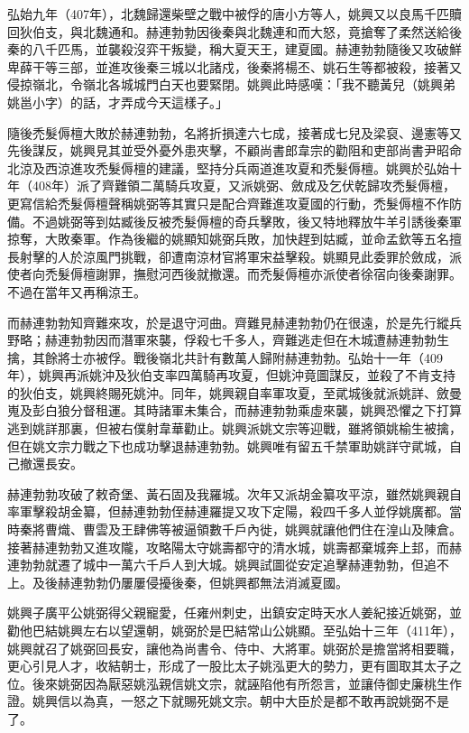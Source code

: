 弘始九年（407年），北魏歸還柴壁之戰中被俘的唐小方等人，姚興又以良馬千匹贖回狄伯支，與北魏通和。赫連勃勃因後秦與北魏連和而大怒，竟搶奪了柔然送給後秦的八千匹馬，並襲殺沒弈干叛變，稱大夏天王，建夏國。赫連勃勃隨後又攻破鮮卑薛干等三部，並進攻後秦三城以北諸戍，後秦將楊丕、姚石生等都被殺，接著又侵掠嶺北，令嶺北各城城門白天也要緊閉。姚興此時感嘆：「我不聽黃兒（姚興弟姚邕小字）的話，才弄成今天這樣子。」

隨後禿髮傉檀大敗於赫連勃勃，名將折損達六七成，接著成七兒及梁裒、邊憲等又先後謀反，姚興見其並受外憂外患夾擊，不顧尚書郎韋宗的勸阻和吏部尚書尹昭命北涼及西涼進攻禿髮傉檀的建議，堅持分兵兩道進攻夏和禿髮傉檀。姚興於弘始十年（408年）派了齊難領二萬騎兵攻夏，又派姚弼、斂成及乞伏乾歸攻禿髮傉檀，更寫信給禿髮傉檀聲稱姚弼等其實只是配合齊難進攻夏國的行動，禿髮傉檀不作防備。不過姚弼等到姑臧後反被禿髮傉檀的奇兵擊敗，後又特地釋放牛羊引誘後秦軍掠奪，大敗秦軍。作為後繼的姚顯知姚弼兵敗，加快趕到姑臧，並命孟欽等五名擅長射擊的人於涼風門挑戰，卻遭南涼材官將軍宋益擊殺。姚顯見此委罪於斂成，派使者向禿髮傉檀謝罪，撫慰河西後就撤還。而禿髮傉檀亦派使者徐宿向後秦謝罪。不過在當年又再稱涼王。

而赫連勃勃知齊難來攻，於是退守河曲。齊難見赫連勃勃仍在很遠，於是先行縱兵野略；赫連勃勃因而潛軍來襲，俘殺七千多人，齊難逃走但在木城遭赫連勃勃生擒，其餘將士亦被俘。戰後嶺北共計有數萬人歸附赫連勃勃。弘始十一年（409年），姚興再派姚沖及狄伯支率四萬騎再攻夏，但姚沖竟圖謀反，並殺了不肯支持的狄伯支，姚興終賜死姚沖。同年，姚興親自率軍攻夏，至貮城後就派姚詳、斂曼嵬及彭白狼分督租運。其時諸軍未集合，而赫連勃勃乘虛來襲，姚興恐懼之下打算逃到姚詳那裏，但被右僕射韋華勸止。姚興派姚文宗等迎戰，雖將領姚榆生被擒，但在姚文宗力戰之下也成功擊退赫連勃勃。姚興唯有留五千禁軍助姚詳守貮城，自己撤還長安。

赫連勃勃攻破了敕奇堡、黃石固及我羅城。次年又派胡金纂攻平涼，雖然姚興親自率軍擊殺胡金纂，但赫連勃勃侄赫連羅提又攻下定陽，殺四千多人並俘姚廣都。當時秦將曹熾、曹雲及王肆佛等被逼領數千戶內徙，姚興就讓他們住在湟山及陳倉。接著赫連勃勃又進攻隴，攻略陽太守姚壽都守的清水城，姚壽都棄城奔上邽，而赫連勃勃就遷了城中一萬六千戶人到大城。姚興試圖從安定追擊赫連勃勃，但追不上。及後赫連勃勃仍屢屢侵擾後秦，但姚興都無法消滅夏國。

姚興子廣平公姚弼得父親寵愛，任雍州刺史，出鎮安定時天水人姜紀接近姚弼，並勸他巴結姚興左右以望還朝，姚弼於是巴結常山公姚顯。至弘始十三年（411年），姚興就召了姚弼回長安，讓他為尚書令、侍中、大將軍。姚弼於是擔當將相要職，更心引見人才，收結朝士，形成了一股比太子姚泓更大的勢力，更有圖取其太子之位。後來姚弼因為厭惡姚泓親信姚文宗，就誣陷他有所怨言，並讓侍御史廉桃生作證。姚興信以為真，一怒之下就賜死姚文宗。朝中大臣於是都不敢再說姚弼不是了。

